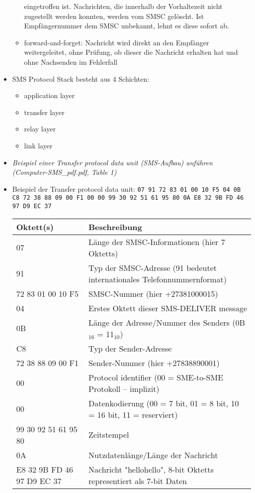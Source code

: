 \documentclass[german,12pt,a4paper]{article}
\begin{document}
\begin{itemize}
\begin{itemize}
				eingetroffen ist. Nachrichten, die innerhalb der Vorhaltezeit nicht zugestellt werden 
				konnten, werden vom SMSC gelöscht. Ist Empfängernummer dem SMSC unbekannt, lehnt es diese sofort ab.
			\item forward-and-forget: Nachricht wird direkt an den Empfänger weitergeleitet, ohne Prüfung, ob 
				dieser die Nachricht erhalten hat und ohne Nachsenden im Fehlerfall
		\end{itemize}	
	\item SMS Protocol Stack besteht aus 4 Schichten:
		\begin{itemize}
			\item application layer
			\item transfer layer
			\item relay layer
			\item link layer
		\end{itemize}		
	\item \textit{Beispiel einer Transfer protocol data unit (SMS-Aufbau) anführen \\(Computer-SMS\_pdf.pdf, Table 1)}
	\item Beispiel der Transfer protocol data unit: 
		\small{\texttt{07 91 72 83 01 00 10 F5 04 0B C8 72 38 88 09 00 F1 00 00 99 30 92 51 61 95 80 0A E8 32 9B FD 46 97 D9 EC 37}}
		
		\begin{tabular}{ p{4cm} | p{10cm} }
			Oktett(s) & Beschreibung \\
			\hline \hline
		  	 07 & Länge der SMSC-Informationen (hier 7 Oktetts) \\ 
		  	 \hline
		  	 91 & Typ der SMSC-Adresse (91 bedeutet internationales Telefonnummernformat) \\ 
		  	 \hline
		  	 72 83 01 00 10 F5 & SMSC-Nummer (hier +27381000015) \\ 
		  	 \hline
		  	 04 & Erstes Oktett dieser SMS-DELIVER message \\ 
		  	 \hline
		  	 0B & Länge der Adresse/Nummer des Senders (0B$_{16}$ = 11$_{10}$) \\ 
		  	 \hline
		  	 C8 & Typ der Sender-Adresse \\ 
		  	 \hline
		  	 72 38 88 09 00 F1 & Sender-Nummer (hier +27838890001) \\ 
		  	 \hline
		  	 00 & Protocol identifier (00 = SME-to-SME Protokoll -- implizit) \\ 
		  	 \hline
		  	 00 & Datenkodierung (00 = 7 bit, 01 = 8 bit, 10 = 16 bit, 11 = reserviert) \\ 
		  	 \hline
		  	 99 30 92 51 61 95 80 & Zeitstempel \\ 
		  	 \hline
		  	 0A & Nutzdatenlänge/Länge der Nachricht \\ 
		  	 \hline
		  	 E8 32 9B FD 46 97 D9 EC 37 & Nachricht "hellohello", 8-bit Oktetts representiert als 7-bit Daten
		\end{tabular}
\end{itemize}
\end{document}
